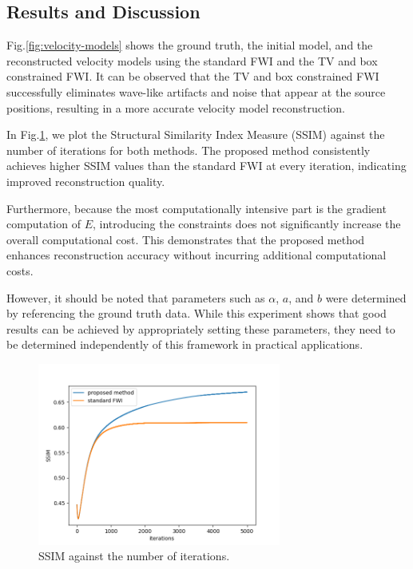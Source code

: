 \subsection{Results and Discussion}\label{subsec:results-and-discussion}

Fig.\ref{fig:velocity-models} shows the ground truth, the initial model, and the reconstructed velocity models using the standard FWI and the TV and box constrained FWI.
It can be observed that the TV and box constrained FWI successfully eliminates wave-like artifacts and noise that appear at the source positions, resulting in a more accurate velocity model reconstruction.

In Fig.\ref{fig:ssim}, we plot the Structural Similarity Index Measure (SSIM) against the number of iterations for both methods.
The proposed method consistently achieves higher SSIM values than the standard FWI at every iteration, indicating improved reconstruction quality.

Furthermore, because the most computationally intensive part is the gradient computation of $E$, introducing the constraints does not significantly increase the overall computational cost.
This demonstrates that the proposed method enhances reconstruction accuracy without incurring additional computational costs.

However, it should be noted that parameters such as $\alpha$, $a$, and $b$ were determined by referencing the ground truth data.
While this experiment shows that good results can be achieved by appropriately setting these parameters, they need to be determined independently of this framework in practical applications.


\begin{figure}[htbp]
\begin{center}
    \includegraphics[width=80mm]{public/ssim}
    \caption{SSIM against the number of iterations.}
    \label{fig:ssim}
\end{center}
\end{figure}
